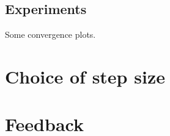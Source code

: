 \documentclass{scrartcl}
\begin{document}
\subsection{Experiments}

Some convergence plots.


\section{Choice of step size}




\section{Feedback}


{}
\end{document}
